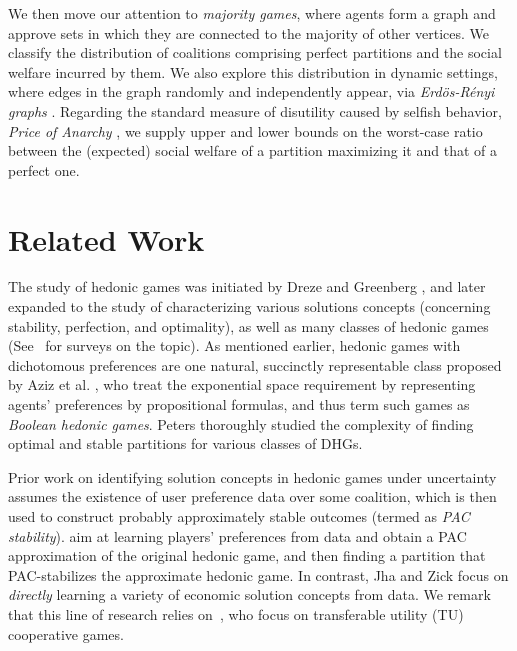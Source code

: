 \documentclass[letterpaper]{article}
\begin{document}
We then move our attention to \textit{majority games}, where agents form a graph and approve sets in which they are connected to the majority of other vertices. We classify the distribution of coalitions comprising perfect partitions and the social welfare incurred by them. We also explore this distribution in dynamic settings, where edges in the graph randomly and independently appear, via \textit{Erd\"{o}s-R\'{e}nyi graphs} \cite{erdos59random}. Regarding the standard measure of disutility caused by selfish behavior, \textit{Price of Anarchy} \cite{koutsoupias1999worst,elkind2016price}, we supply upper and lower bounds on the worst-case ratio between the (expected) social welfare of a partition maximizing it and that of a perfect one. %




\section{Related Work}
\label{sec:Related Work}
The study of hedonic games was initiated by Dreze and Greenberg , and later expanded to the study of characterizing various solutions concepts (concerning stability, perfection, and optimality), as well as many classes of hedonic games (See~\cite{aziz_savani_moulin_2016,woeginger2013core} for surveys on the topic). As mentioned earlier, hedonic games with dichotomous preferences are one natural, succinctly representable class proposed by Aziz et al. , %
who treat the exponential space requirement by representing agents’ preferences by propositional formulas, and thus term such games as \textit{Boolean hedonic games}. %
Peters  thoroughly studied the complexity of finding optimal and stable partitions for various classes of DHGs.

Prior work on identifying solution concepts in hedonic games under uncertainty assumes the existence of user preference data over some coalition, which is then used to construct probably approximately stable outcomes (termed as \textit{PAC stability}). \cite{sliwinski2017learning,igarashi2019forming} aim at learning players' preferences from data and obtain a PAC approximation of the original hedonic game, and then finding a partition that PAC-stabilizes the approximate hedonic game. In contrast, Jha and Zick  focus on \textit{directly} learning a variety of economic solution concepts from data. We remark that this line of research relies on~\cite{balcan2015learning}, who focus on transferable utility (TU) cooperative games.
\end{document}
